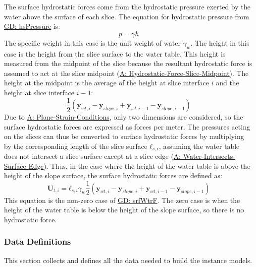 \documentclass[12pt]{article}
\begin{document}
The surface hydrostatic forces come from the hydrostatic pressure exerted by the water above the surface of each slice. The equation for hydrostatic pressure from \hyperref[GD:hsPressure]{GD: hsPressure} is:
\begin{displaymath}
p=γ h
\end{displaymath}
The specific weight in this case is the unit weight of water ${γ_{w}}$. The height in this case is the height from the slice surface to the water table. This height is measured from the midpoint of the slice because the resultant hydrostatic force is assumed to act at the slice midpoint (\hyperref[assumpHFSM]{A: Hydrostatic-Force-Slice-Midpoint}). The height at the midpoint is the average of the height at slice interface $i$ and the height at slice interface $i-1$:
\begin{displaymath}
\frac{1}{2} \left({\mathbf{y}_{wt,i}}-{\mathbf{y}_{slope,i}}+{\mathbf{y}_{wt,i-1}}-{\mathbf{y}_{slope,i-1}}\right)
\end{displaymath}
Due to \hyperref[assumpPSC]{A: Plane-Strain-Conditions}, only two dimensions are considered, so the surface hydrostatic forces are expressed as forces per meter. The pressures acting on the slices can thus be converted to surface hydrostatic forces by multiplying by the corresponding length of the slice surface ${\mathbf{ℓ}_{s,i}}$, assuming the water table does not intersect a slice surface except at a slice edge (\hyperref[assumpWISE]{A: Water-Intersects-Surface-Edge}). Thus, in the case where the height of the water table is above the height of the slope surface, the surface hydrostatic forces are defined as:
\begin{displaymath}
{\mathbf{U}_{t,i}}={\mathbf{ℓ}_{s,i}} {γ_{w}} \frac{1}{2} \left({\mathbf{y}_{wt,i}}-{\mathbf{y}_{slope,i}}+{\mathbf{y}_{wt,i-1}}-{\mathbf{y}_{slope,i-1}}\right)
\end{displaymath}
This equation is the non-zero case of \hyperref[GD:srfWtrF]{GD: srfWtrF}. The zero case is when the height of the water table is below the height of the slope surface, so there is no hydrostatic force.
\subsubsection{Data Definitions}
\label{Sec:DDs}
This section collects and defines all the data needed to build the instance models.
\par~
\end{document}
